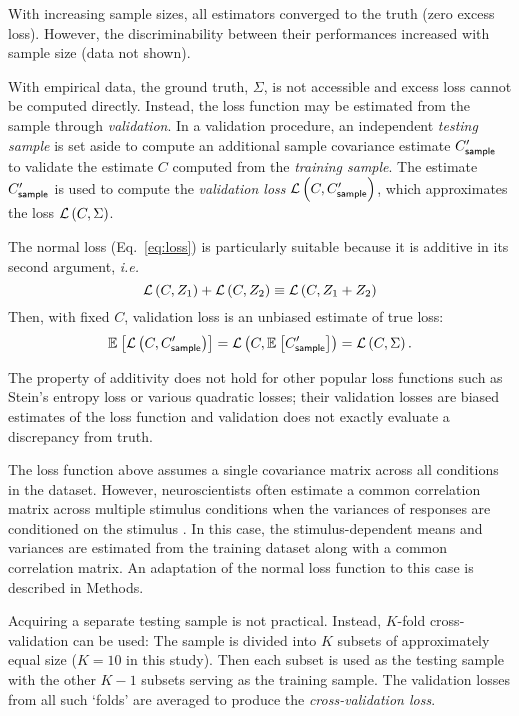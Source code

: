 With increasing sample sizes, all estimators converged to the truth (zero excess loss).  However,
the discriminability between their performances increased with sample size (data not shown).

With empirical data, the ground truth, $\Sigma$, is not accessible and excess loss cannot be computed directly. Instead, the loss function may be estimated from the sample through \emph{validation}.  In a validation procedure, an independent \emph{testing sample} is set aside to compute an additional sample covariance estimate $C_{\sf sample}^\prime$ to validate the estimate $C$ computed from the  \emph{training sample}.   The estimate $C_{\sf sample}^\prime$ is used to compute the \emph{validation loss} $\mathcal L\left(C,C_{\sf sample}^\prime\right)$, which approximates the loss  $\mathcal L\left(C,\Sigma\right)$.

The normal loss (Eq.~\ref{eq:loss}) is particularly suitable because it is additive in its second argument, \emph{i.e.} 
\begin{equation*}\label{eq:additivity}
    \mathcal L\left(C,Z_1\right) + \mathcal L\left(C,Z_2\right) \equiv \mathcal L\left(C,Z_1+Z_2\right)
\end{equation*}
Then, with fixed $C$, validation loss is an unbiased estimate of true loss:
\begin{equation*}
    \mathbb E_{}\left[ \mathcal L\left(C,C_{\sf sample}^\prime\right)\right]=\mathcal L\left(C,\mathbb E_{}\left[ C_{\sf sample}^\prime\right]\right)=\mathcal L\left(C,\Sigma\right).
\end{equation*}

The property of additivity does not hold for other popular loss functions such as Stein's entropy loss or various quadratic losses; their validation losses are biased estimates of the loss function and validation does not exactly evaluate a discrepancy from truth.

The loss function above assumes a single covariance matrix across all conditions in the dataset.  However, neuroscientists often estimate a common correlation matrix across multiple stimulus conditions when the variances of responses are conditioned on the stimulus \cite{Vogels:1989, Ponce:2013}. In this case, the stimulus-dependent means and variances are estimated from the training dataset along with a common correlation matrix. An adaptation of the normal loss function to this case is described in Methods.

Acquiring a separate testing sample is not practical. Instead, $K$-fold cross-validation can be used: The sample is divided into $K$ subsets of approximately equal size ($K=10$ in this study).  Then each subset is used as the testing sample with the other $K-1$ subsets serving as the training sample. The validation losses from all such `folds' are averaged to produce the \emph{cross-validation loss}.


